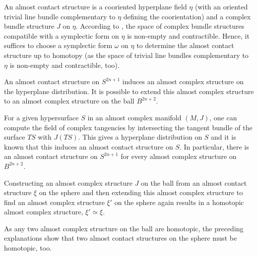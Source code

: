 \begin{definition}
    An almost contact structure is a cooriented hyperplane field $\eta$ (with an oriented trivial line bundle complementary to $\eta$ defining the coorientation) 
    and a complex bundle structure $J$ on $\eta$.
    According to \cite[Prop 2.4.5]{Geiges08}, the space of complex bundle structures compatible with a symplectic form on $\eta$ is non-empty and contractible. 
    Hence, it suffices to choose a symplectic form $\omega$ on $\eta$ to determine the almost contact structure up to homotopy 
    (as the space of trivial line bundles complementary to $\eta$ is non-empty and contractible, too).
\end{definition}

An almost contact structure on $S^{2n+1}$ induces an almost complex structure on the hyperplane distribution.
It is possible to extend this almost complex structure to an almost complex structure on the ball $B^{2n+2}$.

For a given hypersurface $S$ in an almost complex manifold $(M, J)$, one can compute the field of complex tangencies by intersecting
the tangent bundle of the surface $TS$ with $J(TS)$. 
This gives a hyperplane distribution on $S$ and it is known that this induces an almost contact structure on $S$.
In particular, there is an almost contact structure on $S^{2n+1}$ for every almost complex structure on $B^{2n+2}$.

Constructing an almost complex structure $J$ on the ball from an almost contact structure $\xi$ on the sphere and then 
extending this almost complex structure to find an almost complex structure $\xi'$ on the sphere again results in a
homotopic almost complex structure, $\xi' \simeq \xi$.

As any two almost complex structure on the ball are homotopic, the preceding explanations show
that two almost contact structures on the sphere must be homotopic, too.